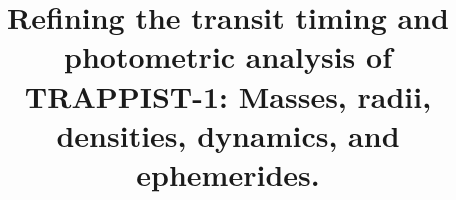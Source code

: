 \documentclass[twocolumn]{aastex63}
\begin{document}
\title{Refining the transit timing and photometric
    analysis of TRAPPIST-1: Masses, radii, densities, dynamics, and ephemerides.}


\end{document}

